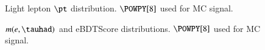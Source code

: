 \begin{figure}[h!tbp]
	\centering
	\hfill
	\caption{Light lepton $\pt$ distribution. $\POWPY[8]$ used for MC signal.}
	\label{AFig14PN}
\end{figure} 

\begin{figure}[h!tbp]
	\centering
	\hfill
	\caption{$m(e,\tauhad)$ and eBDTScore distributions. $\POWPY[8]$ used for MC signal.}
	\label{AFig7PN}
\end{figure} 

